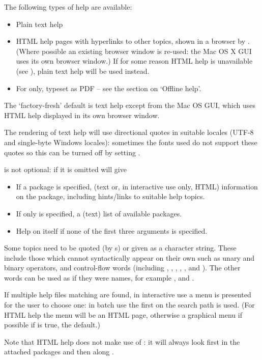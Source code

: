 \begin{Details}\relax
The following types of help are available:
\begin{itemize}

\item Plain text help
\item HTML help pages with hyperlinks to other topics, shown in a
browser by .
(Where possible an existing browser window is re-used: the Mac OS X
GUI uses its own browser window.)
If for some reason HTML help is unavailable (see
), plain text help will be used
instead.
\item For  only, typeset as PDF --
see the section on `Offline help'.

\end{itemize}

The `factory-fresh' default is text help except from the Mac OS
GUI, which uses HTML help displayed in its own browser window.

The rendering of text help will use directional quotes in suitable
locales (UTF-8 and single-byte Windows locales): sometimes the fonts
used do not support these quotes so this can be turned off by setting
.

 is not optional: if it is omitted \R{} will give
\begin{itemize}

\item If a package is specified, (text or, in interactive use only,
HTML) information on the package, including hints/links to suitable
help topics.
\item If  only is specified, a (text) list of available
packages.
\item Help on  itself if none of the first three
arguments is specified.

\end{itemize}


Some topics need to be quoted (by s) or given as a
character string.  These include those which cannot syntactically
appear on their own such as unary and binary operators,
 and control-flow  words (including
,  , , ,
,  and ).  The other 
words can be used as if they were names, for example ,
 and .

If multiple help files matching  are found, in interactive
use a menu is presented for the user to choose one: in batch use the
first on the search path is used.  (For HTML help the menu will be an
HTML page, otherwise a graphical menu if possible if
 is true, the default.)

Note that HTML help does not make use of : it will
always look first in the attached packages and then along
.
\end{Details}

